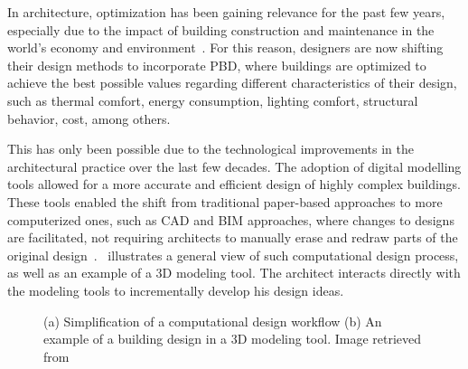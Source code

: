 	In architecture, optimization has been gaining relevance for the past few years, especially due to the impact of building construction and maintenance in the world's economy and environment~\cite{Attia2013, Shi2016}. For this reason, designers are now shifting their design methods to incorporate \ac{PBD}, where buildings are optimized to achieve the best possible values regarding different characteristics of their design, such as thermal comfort, energy consumption, lighting comfort, structural behavior, cost, among others.

	This has only been possible due to the technological improvements in the architectural practice over the last few decades. The adoption of digital modelling tools allowed for a more accurate and efficient design of highly complex buildings. These tools enabled the shift from traditional paper-based approaches to more computerized ones, such as \ac{CAD} and \ac{BIM} approaches, where changes to designs are facilitated, not requiring architects to manually erase and redraw parts of the original design~\cite{Ferreira2015GD}.~ illustrates a general view of such computational design process, as well as an example of a 3D modeling tool. The architect interacts directly with the modeling tools to incrementally develop his design ideas.
	
\begin{figure}[htbp]
\centering
{}%
\hfill
{}%

\caption[General views of Traditional Design Approaches]{(a) Simplification of a computational design workflow (b) An example of a building design in a 3D modeling tool. Image retrieved from~\cite{3DMODELTOOL}}
\label{fig:traditionaldesign}
\end{figure}

